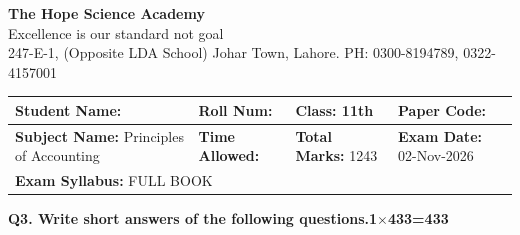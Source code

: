\documentclass[11pt,a4paper]{article}
\begin{document}
\begin{center}
  {\Huge\bfseries The Hope Science Academy}\\[3pt]
  {\small Excellence is our standard not goal}\\[2pt]
  {\small 247-E-1, (Opposite LDA School) Johar Town, Lahore. PH: 0300-8194789, 0322-4157001}
\end{center}

\medskip
\noindent
\begin{tabularx}{\linewidth}{|X|X|X|X|}
\hline
\textbf{Student Name:} & \textbf{Roll Num:} & \textbf{Class:} 11th & \textbf{Paper Code:} \\ \hline
\textbf{Subject Name:} Principles of Accounting & \textbf{Time Allowed:} & \textbf{Total Marks:} 1243 & \textbf{Exam Date:} 02-Nov-2026 \\ \hline
\multicolumn{4}{|l|}{\textbf{Exam Syllabus:} FULL BOOK} \\ \hline
\end{tabularx}

\bigskip
\noindent\textbf{Q3. Write short answers of the following questions.}\hfill\textbf{1$\times$433=433}
\end{document}
